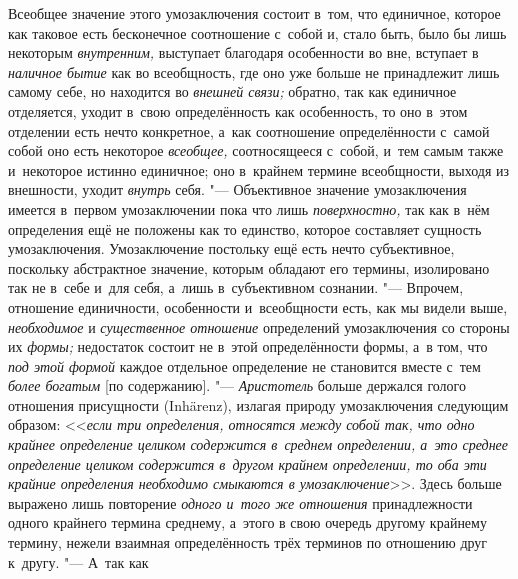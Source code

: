 Всеобщее значение этого умозаключения состоит в~том, что
единичное, которое как таковое есть бесконечное соотношение с~собой и,
стало быть, было бы лишь некоторым
{\em внутренним,}
выступает благодаря особенности во вне, вступает в
{\em наличное бытие} как
во всеобщность, где оно уже больше не принадлежит лишь самому себе, но
находится во {\em внешней связи;}
обратно, так как единичное отделяется, уходит в~свою
определённость как особенность, то оно в~этом отделении есть
нечто конкретное, а~как соотношение определённости с~самой собой оно есть
некоторое {\em всеобщее,}
соотносящееся с~собой, и~тем самым также и~некоторое истинно
единичное; оно в~крайнем термине всеобщности, выходя из внешности, уходит
{\em внутрь} себя. "---
Объективное значение умозаключения имеется в~первом
умозаключении пока что лишь
{\em поверхностно,} так
как в~нём определения ещё не положены как то единство, которое составляет
сущность умозаключения. Умозаключение постольку ещё есть нечто
субъективное, поскольку абстрактное значение, которым обладают его термины,
изолировано так не в~себе и~для себя, а~лишь в~субъективном сознании. "---
Впрочем, отношение единичности, особенности и~всеобщности
есть, как мы видели выше,
{\em необходимое} и
{\em существенное отношение}
определений умозаключения со стороны их
{\em формы;} недостаток
состоит не в~этой определённости формы, а~в том, что
{\em под этой формой}
каждое отдельное определение не становится вместе с~тем
{\em более богатым} [по
содержанию]. "--- {\em Аристотель}
больше держался голого отношения присущности (Inhärenz),
излагая природу умозаключения следующим образом:
<<{\em если три определения, относятся
между собой так, что одно крайнее определение целиком содержится в~среднем
определении, а~это среднее определение целиком содержится в~другом крайнем
определении, то оба эти крайние определения необходимо смыкаются в
умозаключение}>>.
Здесь больше выражено лишь повторение
{\em одного и~того же отношения}
принадлежности одного крайнего термина среднему, а~этого в
свою очередь другому крайнему термину, нежели взаимная определённость трёх
терминов по отношению друг к~другу. "--- А~так как
